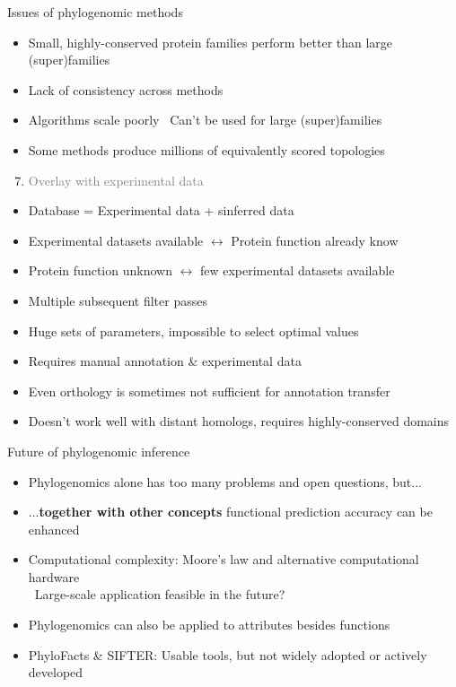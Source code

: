 \documentclass[14pt,xcolor=dvipsnames,pdftex]{beamer}
\begin{document}
\begin{frame}[allowframebreaks]{Issues of phylogenomic methods}
\begin{itemize}
  \item Small, highly-conserved protein families perform better than large (super)families
  \item Lack of consistency across methods
  \item Algorithms scale poorly
  \textrightarrow\ Can't be used for large (super)families
  \item Some methods produce millions of equivalently scored topologies
 \end{itemize}
 \framebreak
 \begin{enumerate}
  \setcounter{enumi}{6}
  \item \textcolor{gray}{Overlay with experimental data}
 \end{enumerate}
 \begin{itemize}
  \item Database = Experimental data + sinferred data
  \item Experimental datasets available
        $\leftrightarrow$ Protein function already know
  \item Protein function unknown $\leftrightarrow$ few experimental datasets available
 \end{itemize}
 \framebreak
 \begin{itemize}
  \item Multiple subsequent filter passes
  \item Huge sets of parameters, impossible to select optimal values
  \item Requires manual annotation \& experimental data
  \item Even orthology is sometimes not sufficient for annotation transfer
  \item Doesn't work well with distant homologs, requires highly-conserved domains
  \end{itemize}
\end{frame}

\begin{frame}{Future of phylogenomic inference}
 \begin{itemize}
  \item Phylogenomics alone has too many problems and open questions, but...
  \pause
  \item ...\textbf{together with other concepts} functional prediction accuracy can be enhanced
  \item Computational complexity: Moore's law and alternative computational hardware\\
  \textrightarrow\ Large-scale application feasible in the future?
  \item Phylogenomics can also be applied to attributes besides functions
  \item PhyloFacts \& SIFTER: Usable tools, but not widely adopted or actively developed
 \end{itemize}
\end{frame}
\end{document}
